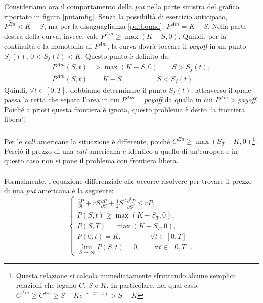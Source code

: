 \documentclass[a4paper,10pt]{report}
\newcommand{\der}[2]{\frac{\partial #1}{\partial #2}}
\newcommand{\dder}[2]{\frac{\partial^2 #1}{\partial #2^2}}
\theoremstyle{plain}
\theoremstyle{definition}
\theoremstyle{remark}
\begin{document}
Consideriamo ora il comportamento della \emph{put} nella parte sinistra del grafico riportato in figura \ref{putamfig}. Senza la possibilt\`a di esercizio anticipato, $P^{Eu}<K-S$, ma per la disuguaglianza \ref{putbound}, $P^{Am}=K-S$. Nella parte destra della curva, invece, vale $P^{Am}\geq \max(K-S,0)$. Quindi, per la continuit\`a e la monotonia di $P^{Am}$, la curva dovr\`a toccare il \emph{payoff} in un punto $S_f(t)$, $0<S_f(t)<K$. Questo punto \`e definito da:
\begin{align*}
P^{Am}(S,t)&>\max(K-S,0)\qquad S>S_f(t),\\
P^{Am}(S,t)&=K-S\qquad\qquad\quad S<S_f(t).
\end{align*}
Quindi, $\forall t\in[0,T]$, dobbiamo determinare il punto $S_f(t)$, attraverso il quale passa la retta che separa l'area in cui $P^{Am}=$\emph{payoff} da qualla in cui $P^{Am}>$\emph{payoff}. Poich\'e a priori questa frontiera \`e ignota, questo problema \`e detto ``a frontiera libera''.\\\\Per le \emph{call} americane la situazione \`e differente, poich\'e $C^{Eu}\geq \max(S_T-K,0)$\footnote{Questa relazione si calcola immediatamente sfruttando alcune semplici relazioni che legano $C$, $S$ e $K$. In particolare, nel qual caso: $C^{Am}\geq C^{Eu} \geq S-Ke^{-r(T-t)} > S-K$}. Perci\`o il prezzo di una \emph{call} americana \`e identico a quello di un'europea e in questo caso non si pone il problema con frontiera libera.\\\\Formalmente, l'equazione differenziale che occorre risolvere per trovare il prezzo di una \emph{put} americana \`e la seguente:
\begin{equation}
\begin{cases}
\displaystyle
\der{P}{t}+r S \der{P}{S} +\frac{1}{2}S^2\dder{P}{S}\leq rP,\\
P(S,t)\geq \max(K-S_T,0),\\
P(S,T)=\max(K-S_T,0),\\
P(0,t)=K,\qquad\qquad\forall t\in[0,T]\\
\lim\limits_{S\to\infty}P(S,t)=0,\qquad\forall t\in[0,T].
\end{cases}
\label{putam1d}
\end{equation}
\end{document}
